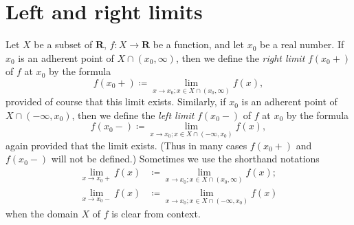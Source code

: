 \section{Left and right limits}\label{sec 9.5}

\begin{definition}\label{9.5.1}
    Let \(X\) be a subset of \(\mathbf{R}\), \(f : X \to \mathbf{R}\) be a function, and let \(x_0\) be a real number.
    If \(x_0\) is an adherent point of \(X \cap (x_0, \infty)\), then we define the \emph{right limit} \(f(x_0+)\) of \(f\) at \(x_0\) by the formula
    \[
        f(x_0+) \coloneqq \lim_{x \to x_0 ; x \in X \cap (x_0, \infty)} f(x),
    \]
    provided of course that this limit exists.
    Similarly, if \(x_0\) is an adherent point of \(X \cap (-\infty, x_0)\), then we define the \emph{left limit} \(f(x_0-)\) of \(f\) at \(x_0\) by the formula
    \[
        f(x_0-) \coloneqq \lim_{x \to x_0 ; x \in X \cap (-\infty, x_0)} f(x),
    \]
    again provided that the limit exists.
    (Thus in many cases \(f(x_0+)\) and \(f(x_0-)\) will not be defined.)
    Sometimes we use the shorthand notations
    \begin{align*}
        \lim_{x \to x_0+} f(x) & \coloneqq \lim_{x \to x_0 ; x \in X \cap (x_0, \infty)} f(x); \\
        \lim_{x \to x_0-} f(x) & \coloneqq \lim_{x \to x_0 ; x \in X \cap (-\infty, x_0)} f(x)
    \end{align*}
    when the domain \(X\) of \(f\) is clear from context.
\end{definition}